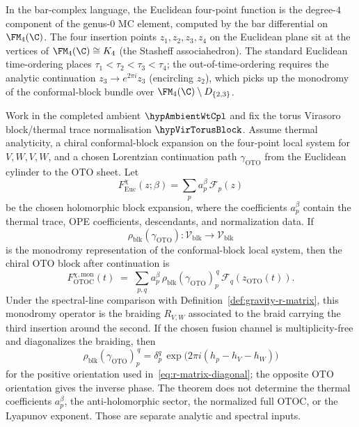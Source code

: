 In the bar-complex language, the Euclidean four-point function is
the degree-$4$ component of the genus-$0$ MC element, computed by
the bar differential on $\FM_4(\C)$. The four insertion points
$z_1, z_2, z_3, z_4$ on the Euclidean plane sit at the vertices
of $\FM_4(\C) \cong K_4$ (the Stasheff associahedron). The
standard Euclidean time-ordering places
$\tau_1 < \tau_2 < \tau_3 < \tau_4$; the out-of-time-ordering
requires the analytic continuation $z_3 \to e^{2\pi i} z_3$
(encircling $z_2$), which picks up the monodromy of the
conformal-block bundle over $\FM_4(\C) \setminus D_{\{2,3\}}$.

\begin{theorem}
\label{thm:otoc-r-matrix}%
%
%
Work in the completed ambient \(\hypAmbientWtCpl\) and fix the torus
Virasoro block/thermal trace normalisation \(\hypVirTorusBlock\).
Assume thermal analyticity, a chiral conformal-block expansion on the
four-point local system for \(V,W,V,W\), and a chosen Lorentzian
continuation path \(\gamma_{\mathrm{OTO}}\) from the Euclidean cylinder
to the OTO sheet.  Let
\[
F^{\chi}_{\mathrm{Euc}}(z;\beta)
=\sum_p a_p^\beta\,\mathcal F_p(z)
\]
be the chosen holomorphic block expansion, where the coefficients
\(a_p^\beta\) contain the thermal trace, OPE coefficients, descendants,
and normalization data.  If
\[
\rho_{\mathrm{blk}}(\gamma_{\mathrm{OTO}})\colon
\mathcal V_{\mathrm{blk}}\longrightarrow \mathcal V_{\mathrm{blk}}
\]
is the monodromy representation of the conformal-block local system,
then the chiral OTO block after continuation is
\begin{equation}\label{eq:otoc-r-matrix}
F_{\mathrm{OTOC}}^{\chi,\mathrm{mon}}(t)
\;=\;
\sum_{p,q} a_p^\beta\,
\rho_{\mathrm{blk}}(\gamma_{\mathrm{OTO}})_{p}^{\,q}\,
{\mathcal F}_q(z_{\mathrm{OTO}}(t)).
\end{equation}
Under the spectral-line comparison with
Definition~\ref{def:gravity-r-matrix}, this monodromy operator is the
braiding \(R_{V,W}\) associated to the braid carrying the third
insertion around the second.  If the chosen fusion channel is
multiplicity-free and diagonalizes the braiding, then
\[
\rho_{\mathrm{blk}}(\gamma_{\mathrm{OTO}})_{p}^{\,q}
=\delta_p^q\,
\exp\!\bigl(2\pi i(h_p-h_V-h_W)\bigr)
\]
for the positive orientation used in~\eqref{eq:r-matrix-diagonal}; the
opposite OTO orientation gives the inverse phase.  The theorem does not
determine the thermal coefficients \(a_p^\beta\), the anti-holomorphic
sector, the normalized full OTOC, or the Lyapunov exponent.  Those are
separate analytic and spectral inputs.
\end{theorem}

